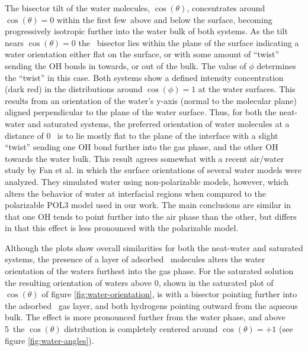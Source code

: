The bisector tilt of the water molecules, $\cos(\theta)$, concentrates around $\cos(\theta)=0$ within the first few\angs~above and below the surface, becoming progressively isotropic further into the water bulk of both systems. As the tilt nears $\cos(\theta)=0$ the \wat~bisector lies within the plane of the surface indicating a water orientation either flat on the surface, or with some amount of ``twist'' sending the OH bonds in towards, or out of the bulk. The value of $\phi$ determines the ``twist'' in this case. Both systems show a defined intensity concentration (dark red) in the distributions around $\cos(\phi)=1$ at the water surfaces. This results from an orientation of the water's y-axis (normal to the molecular plane) aligned perpendicular to the plane of the water surface. Thus, for both the neat-water and saturated systems, the preferred orientation of water molecules at a distance of 0\angs~ is to lie mostly flat to the plane of the interface with a slight ``twist'' sending one OH bond further into the gas phase, and the other OH towards the water bulk. This result agrees somewhat with a recent air/water study by Fan et al. in which the surface orientations of several water models were analyzed.\cite{Fan2009} They simulated water using non-polarizable models, however, which alters the behavior of water at interfacial regions when compared to the polarizable POL3 model used in our work. The main conclusions are similar in that one OH tends to point further into the air phase than the other, but differs in that this effect is less pronounced with the polarizable model.

Although the plots show overall similarities for both the neat-water and saturated systems, the presence of a layer of adsorbed \suldiox~molecules alters the water orientation of the waters furthest into the gas phase. For the saturated solution the resulting orientation of waters above 0\angs, shown in the saturated plot of $\cos(\theta)$ of figure \ref{fig:water-orientation}, is with a bisector pointing further into the adsorbed \suldiox~gas layer, and both hydrogens pointing outward from the aqueous bulk. The effect is more pronounced further from the water phase, and above 5\angs~the $\cos(\theta)$ distribution is completely centered around $\cos(\theta)=+1$ (see figure \ref{fig:water-angles}).

